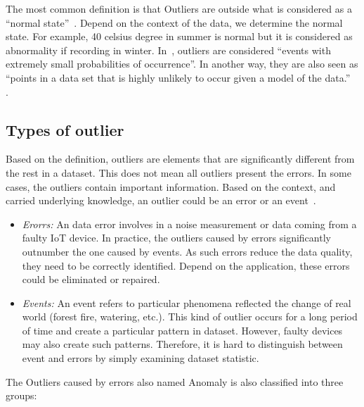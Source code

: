 The most common definition is that Outliers are outside what is considered as a ``normal state''~\cite{javed2012automated}. Depend on the context of the data, we determine the normal state. For example, 40 celsius degree in summer is normal but it is considered as abnormality if recording in winter.  
In~\cite{branch2013network}, outliers are considered ``events with extremely small probabilities of occurrence''. In another way, they are also seen as ``points in a data set that is highly unlikely to occur given a model of the data.''~\cite{otey2005fast} .

\subsection{Types of outlier}

Based on the definition, outliers are elements that are significantly different from the rest in a dataset. This does not mean all outliers present the errors. In some cases, the outliers contain important information. Based on the context, and carried underlying knowledge, an outlier could be an error or an event~\cite{zhang2010outlier}.

\begin{itemize}

    \item \textit{Erorrs: } An data error involves in a noise measurement or data coming from a faulty IoT device. In practice, the outliers caused by errors significantly outnumber the one caused by events. As such errors reduce the data quality, they need to be correctly identified. Depend on the application, these errors could be eliminated or repaired.
    
    \item \textit{Events: } An event refers to particular phenomena reflected the change of real world (forest fire, watering, etc.). This kind of outlier occurs for a long period of time and create a particular pattern in dataset. However, faulty devices may also create such patterns. Therefore, it is hard to distinguish between event and errors by simply examining dataset statistic. 
    
\end{itemize}

The Outliers caused by errors also named Anomaly is also classified into three  groups\cite{chandola2009anomaly}:

